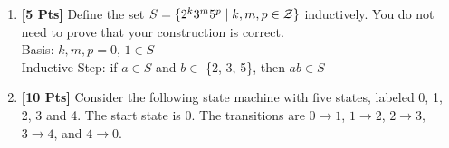 \documentclass[11pt]{article}
\begin{document}
\begin{enumerate}
\begin{enumerate}
            \item {\bf [6 Pts]} $S \subseteq A$ by structural induction.
            \begin{enumerate}
                \item Base case: $4 = 4^1$, so $4 \in S$ and $4 \in A$
                \item Induction Hypothesis: $x, y \in S$, assume $x, y \in A$. By (2), $xy \in S$
                \item Prove: $xy \in A$
                \item $x, y \in A$, so $x = 4^a$, $a \in Z^+$ and $y = 4^b$, $b \in Z^+$ \null\hfill IH
                \item $xy = 4^{a + b}$, $a + b \in Z^+$. Therefore, $xy \in A$ \null\hfill Def. of A; QED
            \end{enumerate}

        \end{enumerate}

        \item {\bf [5 Pts]} Define the set $S = \{2^k 3^m 5^p\mid k,m,p \in \cal Z\}$ inductively. You do not need to prove that your construction is correct. \\
        Basis: $k, m, p = 0$, $1 \in S$ \\
        Inductive Step: if $a \in S$ and $b \in$ \{2, 3, 5\}, then $ab \in S$

        \item {\bf [10 Pts]} Consider the following state machine with five states, labeled 0, 1, 2, 3 and 4. The start state is 0. The transitions are $0 \rightarrow 1$, $1 \rightarrow 2$, $2 \rightarrow 3$, $3 \rightarrow 4$, and $4 \rightarrow 0$.


\end{enumerate}
\end{document}
